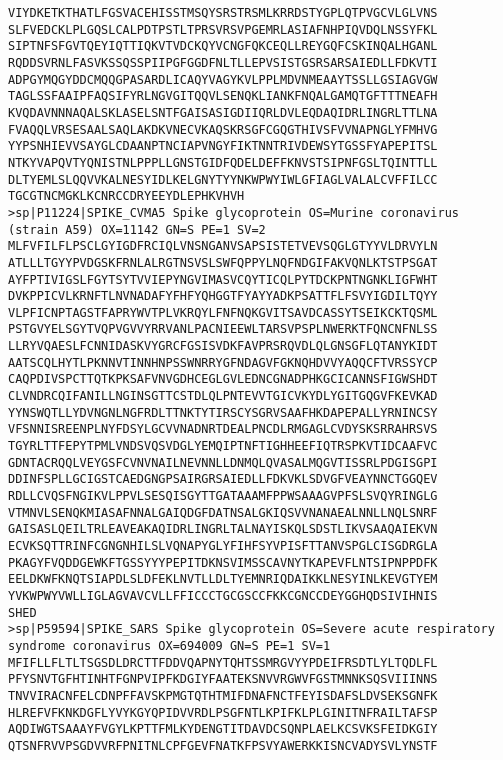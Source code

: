 \begin{lstlisting}
VIYDKETKTHATLFGSVACEHISSTMSQYSRSTRSMLKRRDSTYGPLQTPVGCVLGLVNS
SLFVEDCKLPLGQSLCALPDTPSTLTPRSVRSVPGEMRLASIAFNHPIQVDQLNSSYFKL
SIPTNFSFGVTQEYIQTTIQKVTVDCKQYVCNGFQKCEQLLREYGQFCSKINQALHGANL
RQDDSVRNLFASVKSSQSSPIIPGFGGDFNLTLLEPVSISTGSRSARSAIEDLLFDKVTI
ADPGYMQGYDDCMQQGPASARDLICAQYVAGYKVLPPLMDVNMEAAYTSSLLGSIAGVGW
TAGLSSFAAIPFAQSIFYRLNGVGITQQVLSENQKLIANKFNQALGAMQTGFTTTNEAFH
KVQDAVNNNAQALSKLASELSNTFGAISASIGDIIQRLDVLEQDAQIDRLINGRLTTLNA
FVAQQLVRSESAALSAQLAKDKVNECVKAQSKRSGFCGQGTHIVSFVVNAPNGLYFMHVG
YYPSNHIEVVSAYGLCDAANPTNCIAPVNGYFIKTNNTRIVDEWSYTGSSFYAPEPITSL
NTKYVAPQVTYQNISTNLPPPLLGNSTGIDFQDELDEFFKNVSTSIPNFGSLTQINTTLL
DLTYEMLSLQQVVKALNESYIDLKELGNYTYYNKWPWYIWLGFIAGLVALALCVFFILCC
TGCGTNCMGKLKCNRCCDRYEEYDLEPHKVHVH
>sp|P11224|SPIKE_CVMA5 Spike glycoprotein OS=Murine coronavirus (strain A59) OX=11142 GN=S PE=1 SV=2
MLFVFILFLPSCLGYIGDFRCIQLVNSNGANVSAPSISTETVEVSQGLGTYYVLDRVYLN
ATLLLTGYYPVDGSKFRNLALRGTNSVSLSWFQPPYLNQFNDGIFAKVQNLKTSTPSGAT
AYFPTIVIGSLFGYTSYTVVIEPYNGVIMASVCQYTICQLPYTDCKPNTNGNKLIGFWHT
DVKPPICVLKRNFTLNVNADAFYFHFYQHGGTFYAYYADKPSATTFLFSVYIGDILTQYY
VLPFICNPTAGSTFAPRYWVTPLVKRQYLFNFNQKGVITSAVDCASSYTSEIKCKTQSML
PSTGVYELSGYTVQPVGVVYRRVANLPACNIEEWLTARSVPSPLNWERKTFQNCNFNLSS
LLRYVQAESLFCNNIDASKVYGRCFGSISVDKFAVPRSRQVDLQLGNSGFLQTANYKIDT
AATSCQLHYTLPKNNVTINNHNPSSWNRRYGFNDAGVFGKNQHDVVYAQQCFTVRSSYCP
CAQPDIVSPCTTQTKPKSAFVNVGDHCEGLGVLEDNCGNADPHKGCICANNSFIGWSHDT
CLVNDRCQIFANILLNGINSGTTCSTDLQLPNTEVVTGICVKYDLYGITGQGVFKEVKAD
YYNSWQTLLYDVNGNLNGFRDLTTNKTYTIRSCYSGRVSAAFHKDAPEPALLYRNINCSY
VFSNNISREENPLNYFDSYLGCVVNADNRTDEALPNCDLRMGAGLCVDYSKSRRAHRSVS
TGYRLTTFEPYTPMLVNDSVQSVDGLYEMQIPTNFTIGHHEEFIQTRSPKVTIDCAAFVC
GDNTACRQQLVEYGSFCVNVNAILNEVNNLLDNMQLQVASALMQGVTISSRLPDGISGPI
DDINFSPLLGCIGSTCAEDGNGPSAIRGRSAIEDLLFDKVKLSDVGFVEAYNNCTGGQEV
RDLLCVQSFNGIKVLPPVLSESQISGYTTGATAAAMFPPWSAAAGVPFSLSVQYRINGLG
VTMNVLSENQKMIASAFNNALGAIQDGFDATNSALGKIQSVVNANAEALNNLLNQLSNRF
GAISASLQEILTRLEAVEAKAQIDRLINGRLTALNAYISKQLSDSTLIKVSAAQAIEKVN
ECVKSQTTRINFCGNGNHILSLVQNAPYGLYFIHFSYVPISFTTANVSPGLCISGDRGLA
PKAGYFVQDDGEWKFTGSSYYYPEPITDKNSVIMSSCAVNYTKAPEVFLNTSIPNPPDFK
EELDKWFKNQTSIAPDLSLDFEKLNVTLLDLTYEMNRIQDAIKKLNESYINLKEVGTYEM
YVKWPWYVWLLIGLAGVAVCVLLFFICCCTGCGSCCFKKCGNCCDEYGGHQDSIVIHNIS
SHED
>sp|P59594|SPIKE_SARS Spike glycoprotein OS=Severe acute respiratory syndrome coronavirus OX=694009 GN=S PE=1 SV=1
MFIFLLFLTLTSGSDLDRCTTFDDVQAPNYTQHTSSMRGVYYPDEIFRSDTLYLTQDLFL
PFYSNVTGFHTINHTFGNPVIPFKDGIYFAATEKSNVVRGWVFGSTMNNKSQSVIIINNS
TNVVIRACNFELCDNPFFAVSKPMGTQTHTMIFDNAFNCTFEYISDAFSLDVSEKSGNFK
HLREFVFKNKDGFLYVYKGYQPIDVVRDLPSGFNTLKPIFKLPLGINITNFRAILTAFSP
AQDIWGTSAAAYFVGYLKPTTFMLKYDENGTITDAVDCSQNPLAELKCSVKSFEIDKGIY
QTSNFRVVPSGDVVRFPNITNLCPFGEVFNATKFPSVYAWERKKISNCVADYSVLYNSTF

\end{lstlisting}
